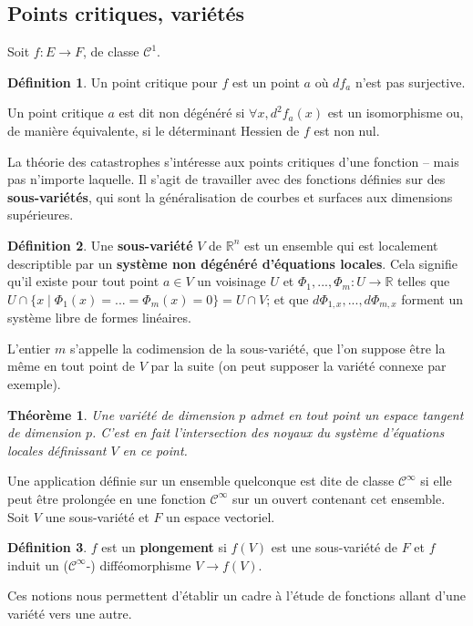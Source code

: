 \documentclass{article}
\newcommand{\cun}{\mathcal{C}^1}
\newcommand{\cinf}{\mathcal{C}^\infty}
\newcommand{\R}{\mathbb{R}}
\newtheorem{thm}{Théorème}
\theoremstyle{definition}
\newtheorem{defn}{Définition}
\begin{document}
\subsection{Points critiques, variétés}

Soit $f:E\to F$, de classe $\cun$.
\begin{defn}
	Un point critique pour $f$ est un point $a$ où $df_a$ n'est pas surjective.

	Un point critique $a$ est dit non dégénéré si $\forall x, d^2f_a(x)$ est un isomorphisme ou, de manière équivalente, si le déterminant Hessien de $f$ est non nul.
\end{defn}

La théorie des catastrophes s'intéresse aux points critiques d'une fonction -- mais pas n'importe laquelle.
Il s'agit de travailler avec des fonctions définies sur des \textbf{sous-variétés}, qui sont la généralisation de courbes et surfaces aux dimensions supérieures.
\begin{defn}
	Une \textbf{sous-variété} $V$ de $\R^n$ est un ensemble qui est localement descriptible par un \textbf{système non dégénéré d'équations locales}.
	Cela signifie qu'il existe pour tout point $a\in V$ un voisinage $U$ et $\Phi_1,...,\Phi_m: U \to\R$ telles que $U\cap\{x\mid \Phi_1(x)=...=\Phi_m(x)=0\}=U\cap V$; et que $d\Phi_{1,x},...,d\Phi_{m,x}$ forment un système libre de formes linéaires.

	L'entier $m$ s'appelle la codimension de la sous-variété, que l'on suppose être la même en tout point de $V$ par la suite (on peut supposer la variété connexe par exemple).
\end{defn}
\begin{thm}
	Une variété de dimension $p$ admet en tout point un espace tangent de dimension $p$.
	C'est en fait l'intersection des noyaux du système d'équations locales définissant $V$ en ce point.
\end{thm}

Une application définie sur un ensemble quelconque est dite de classe $\cinf$ si elle peut être prolongée en une fonction $\cinf$ sur un ouvert contenant cet ensemble. Soit $V$ une sous-variété et $F$ un espace vectoriel.
\begin{defn}
	$f$ est un \textbf{plongement} si $f(V)$ est une sous-variété de $F$ et $f$ induit un ($\cinf$-) difféomorphisme $V\to f(V)$.
\end{defn}

Ces notions nous permettent d'établir un cadre à l'étude de fonctions allant d'une variété vers une autre.
\end{document}
